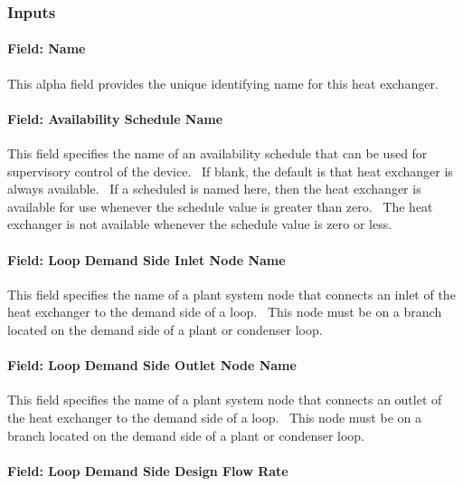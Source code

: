 \subsubsection{Inputs}\label{inputs-15-002}

\paragraph{Field: Name}\label{field-name-13-001}

This alpha field provides the unique identifying name for this heat exchanger.

\paragraph{Field: Availability Schedule Name}\label{field-availability-schedule-name-001}

This field specifies the name of an availability schedule that can be used for supervisory control of the device.~ If blank, the default is that heat exchanger is always available.~ If a scheduled is named here, then the heat exchanger is available for use whenever the schedule value is greater than zero.~ The heat exchanger is not available whenever the schedule value is zero or less.

\paragraph{Field: Loop Demand Side Inlet Node Name}\label{field-loop-demand-side-inlet-node-name}

This field specifies the name of a plant system node that connects an inlet of the heat exchanger to the demand side of a loop.~ This node must be on a branch located on the demand side of a plant or condenser loop.

\paragraph{Field: Loop Demand Side Outlet Node Name}\label{field-loop-demand-side-outlet-node-name}

This field specifies the name of a plant system node that connects an outlet of the heat exchanger to the demand side of a loop.~ This node must be on a branch located on the demand side of a plant or condenser loop.

\paragraph{Field: Loop Demand Side Design Flow Rate}\label{field-loop-demand-side-design-flow-rate}

